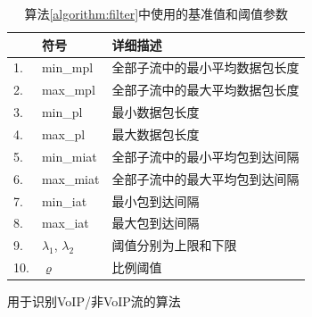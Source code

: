 \begin{table}[htbp]
  \caption{算法\ref{algorithm:filter}中使用的基准值和阈值参数}
  \label{tab:rules}
  \centering
  \begin{tabular}{l l l}
    \hline
    \textbf{} & \textbf{符号} & \textbf{详细描述}\\
    \hline
    1. & min\_mpl      &   全部子流中的最小平均数据包长度\\
    2. & max\_mpl      &  全部子流中的最大平均数据包长度\\
    3. & min\_pl      &   最小数据包长度\\
    4. & max\_pl      &   最大数据包长度\\
    5. & min\_miat      &   全部子流中的最小平均包到达间隔\\
    6. & max\_miat      &   全部子流中的最大平均包到达间隔\\
    7. & min\_iat      &   最小包到达间隔\\
    8. & max\_iat      &  最大包到达间隔\\
    9. & ${\lambda_1}$, ${\lambda_2}$      &  阈值分别为上限和下限 \\
    10. & ${\varrho}$    &   比例阈值\\
    \hline
  \end{tabular}
\end{table}



\begin{algorithm}[h]
\caption{用于识别VoIP/非VoIP流的算法}
\label{algorithm:filter}
\end{algorithm}

